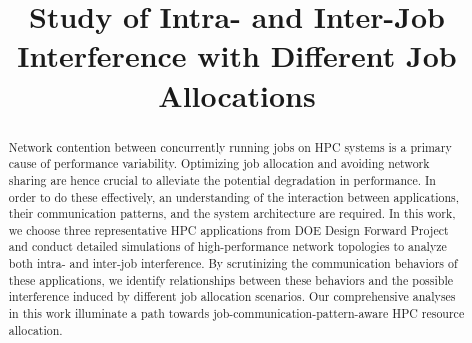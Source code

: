\documentclass[conference]{IEEEtran}
\begin{document}
%
\title{Study of Intra- and Inter-Job Interference with Different Job Allocations}
\author{



}

\maketitle


\begin{abstract} 

Network contention between concurrently running jobs on HPC systems is a primary cause of performance variability. Optimizing job allocation and avoiding network sharing are hence crucial to alleviate the potential degradation in performance. In order to do these effectively, an understanding of the interaction between applications, their communication patterns, and the system architecture are required. In this work, we choose three representative HPC applications from DOE Design Forward Project and conduct detailed simulations of high-performance network topologies to analyze both intra- and inter-job interference. By scrutinizing the communication behaviors of these applications, we identify relationships between these behaviors and the possible interference induced by different job allocation scenarios. Our comprehensive analyses in this work illuminate a path towards job-communication-pattern-aware HPC resource allocation.


\end{abstract}

\IEEEpeerreviewmaketitle
\end{document}
